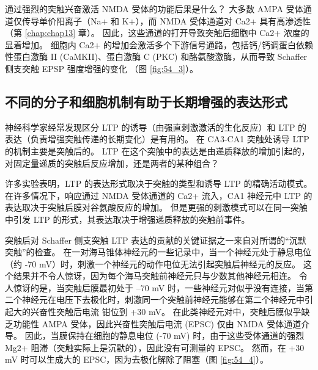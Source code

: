 通过强烈的突触兴奋激活 NMDA 受体的功能后果是什么？ 大多数 AMPA 受体通道仅传导单价阳离子（Na+ 和 K+），而 NMDA 受体通道对 Ca2+ 具有高渗透性（第 \ref{chap:chap13} 章）。 因此，这些通道的打开导致突触后细胞中 Ca2+ 浓度的显着增加。 细胞内 Ca2+ 的增加会激活多个下游信号通路，包括钙/钙调蛋白依赖性蛋白激酶 II (CaMKII)、蛋白激酶 C (PKC) 和酪氨酸激酶，从而导致 Schaffer 侧支突触 EPSP 强度增强的变化 （图 \ref{fig:54_3}）。

\subsection{不同的分子和细胞机制有助于长期增强的表达形式}
神经科学家经常发现区分 LTP 的诱导（由强直刺激激活的生化反应）和 LTP 的表达（负责增强突触传递的长期变化）是有用的。 在 CA3-CA1 突触处诱导 LTP 的机制主要是突触后的。 LTP 在这个突触中的表达是由递质释放的增加引起的，对固定量递质的突触后反应增加，还是两者的某种组合？

许多实验表明，LTP 的表达形式取决于突触的类型和诱导 LTP 的精确活动模式。 在许多情况下，响应通过 NMDA 受体通道的 Ca2+ 流入，CA1 神经元中 LTP 的表达取决于突触后膜对谷氨酸反应的增加。 但是更强的刺激模式可以在同一突触中引发 LTP 的形式，其表达取决于增强递质释放的突触前事件。

突触后对 Schaffer 侧支突触 LTP 表达的贡献的关键证据之一来自对所谓的“沉默突触”的检查。 在一对海马锥体神经元的一些记录中，当一个神经元处于静息电位（约 -70 mV）时，刺激一个神经元的动作电位无法引起突触后神经元的反应。 这个结果并不令人惊讶，因为每个海马突触前神经元只与少数其他神经元相连。 令人惊讶的是，当突触后膜最初处于 –70 mV 时，一些神经元对似乎没有连接，当第二个神经元在电压下去极化时，刺激同一个突触前神经元能够在第二个神经元中引起大的兴奋性突触后电流 钳位到 +30 mV。 在此类神经元对中，突触后膜似乎缺乏功能性 AMPA 受体，因此兴奋性突触后电流 (EPSC) 仅由 NMDA 受体通道介导。 因此，当膜保持在细胞的静息电位 (-70 mV) 时，由于这些受体通道的强烈 Mg2+ 阻滞（突触实际上是沉默的），因此没有可测量的 EPSC。 然而，在 +30 mV 时可以生成大的 EPSC，因为去极化解除了阻塞（图 \ref{fig:54_4}）。

